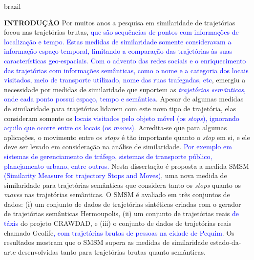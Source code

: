 {
    \begin{otherlanguage*}{brazil}
    \begin{resumo}
        \textbf{INTRODUÇÃO}
        \newline
        \newline
        Por muitos anos a pesquisa em similaridade de trajetórias focou nas trajetórias brutas, \textcolor{blue}{que são sequências de pontos com informações de localização e tempo. Estas medidas de similaridade somente consideravam a informação espaço-temporal, limitando a comparação das trajetórias às suas características geo-espaciais. Com o advento das redes sociais e o enriquecimento das trajetórias com informações semânticas, como o nome e a categoria dos locais visitados, meio de transporte utilizado, nome das ruas trafegadas, etc}, emergiu a necessidade por medidas de similaridade que suportem as \textcolor{blue}{\emph{trajetórias semânticas}, onde cada ponto possui espaço, tempo e semântica}. Apesar de algumas medidas de similaridade para trajetórias lidarem com este novo tipo de trajetória, elas consideram somente os \textcolor{blue}{locais visitados pelo objeto móvel (os \emph{stops}), ignorando aquilo que ocorre entre os locais (os \emph{moves})}.
        Acredita-se que para algumas aplicações, o movimento entre os \emph{stops} é tão importante quanto o \emph{stop} em si, e ele deve ser levado em consideração na análise de similaridade. \textcolor{blue}{Por exemplo em sistemas de gerenciamento de tráfego, sistemas de transporte público, planejamento urbano, entre outros.}
        Nesta dissertação é proposta a medida SMSM \textcolor{blue}{(Similarity Measure for trajectory Stops and Moves)}, uma nova medida de similaridade para trajetórias semânticas que considera tanto os \emph{stops} quanto os \emph{moves} nas trajetórias semânticas.
        O SMSM é avaliado em três conjuntos de dados: (i) um conjunto de dados de trajetórias sintéticas criadas com o gerador de trajetórias semânticas Hermoupolis, (ii) um conjunto de trajetórias reais \textcolor{blue}{de táxis} do projeto CRAWDAD, e (iii) o conjunto de dados de trajetórias reais chamado Geolife\textcolor{blue}{, com trajetórias brutas de pessoas na cidade de Pequim}. Os resultados mostram que o SMSM supera as medidas de similaridade estado-da-arte desenvolvidas tanto para trajetórias brutas quanto semânticas.
        

\end{resumo}
\end{otherlanguage*}}
